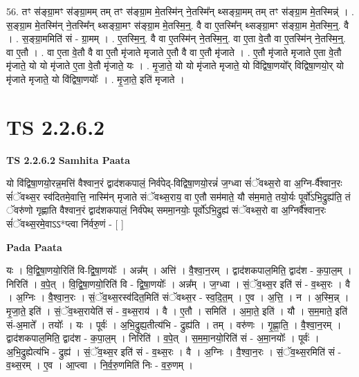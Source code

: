 \documentclass[17pt]{extarticle}
\begin{document}
56. तꣳ स॑ङ्ग्रा॒मꣳ स॑ङ्ग्रा॒मम् तम् तꣳ स॑ङ्ग्रा॒म मे॒तस्मि॑न् ने॒तस्मि᳚न् थ्सङ्ग्रा॒मम् तम् तꣳ स॑ङ्ग्रा॒म मे॒तस्मिन्न्॑ । . स॒ङ्ग्रा॒म मे॒तस्मि॑न् ने॒तस्मि᳚न् थ्सङ्ग्रा॒मꣳ स॑ङ्ग्रा॒म मे॒तस्मि॒न्॒. वै वा ए॒तस्मि᳚न् थ्सङ्ग्रा॒मꣳ स॑ङ्ग्रा॒म मे॒तस्मि॒न्॒. वै । . स॒ङ्ग्रा॒ममिति॑ सं - ग्रा॒मम् । . ए॒तस्मि॒न्॒. वै वा ए॒तस्मि॑न् ने॒तस्मि॒न्॒. वा ए॒ता वे॒तौ वा ए॒तस्मि॑न् ने॒तस्मि॒न्॒. वा ए॒तौ । . वा ए॒ता वे॒तौ वै वा ए॒तौ मृ॑जाते मृजाते ए॒तौ वै वा ए॒तौ मृ॑जाते । . ए॒तौ मृ॑जाते मृजाते ए॒ता वे॒तौ मृ॑जाते॒ यो यो मृ॑जाते ए॒ता वे॒तौ मृ॑जाते॒ यः । . मृ॒जा॒ते॒ यो यो मृ॑जाते मृजाते॒ यो वि॑द्विषा॒णयो᳚र् विद्विषा॒णयो॒र् यो मृ॑जाते मृजाते॒ यो वि॑द्विषा॒णयोः᳚ । . मृ॒जा॒ते॒ इति॑ मृजाते । \newline
\pagebreak
{}
\section*{ TS 2.2.6.2 }

\textbf{TS 2.2.6.2 } \newline
\textbf{Samhita Paata} \newline

यो वि॑द्विषा॒णयो॒रन्न॒मत्ति॑ वैश्वान॒रं द्वाद॑शकपालं॒ निर्व॑पेद्-विद्विषा॒णयो॒रन्नं॑ ज॒ग्ध्वा सं॑ॅवथ्स॒रो वा अ॒ग्नि-र्वै᳚श्वान॒रः सं॑ॅवथ्स॒र स्व॑दितमे॒वात्ति॒ नास्मि॑न् मृजाते संॅवथ्स॒राय॒ वा ए॒तौ सम॑माते॒ यौ स॑म॒माते॒ तयो॒र्यः पूर्वो॑ऽभि॒द्रुह्य॑ति॒ तं ॅवरु॑णो गृह्णाति वैश्वान॒रं द्वाद॑शकपालं॒ निर्व॑पेथ् सममा॒नयोः॒ पूर्वो॑ऽभि॒द्रुह्य॑ संॅवथ्स॒रो वा अ॒ग्निर्वै᳚श्वान॒रः सं॑ॅवथ्स॒रमे॒वाऽऽ*प्त्वा नि॑र्वरु॒णं - [  ] \newline

\textbf{Pada Paata} \newline

यः । वि॒द्वि॒षा॒णयो॒रिति॑ वि-द्वि॒षा॒णयोः᳚ । अन्न᳚म् । अत्ति॑ । वै॒श्वा॒न॒रम् । द्वाद॑शकपाल॒मिति॒ द्वाद॑श - क॒पा॒ल॒म् । निरिति॑ । व॒पे॒त् । वि॒द्वि॒षा॒णयो॒रिति॑ वि - द्वि॒षा॒णयोः᳚ । अन्न᳚म् । ज॒ग्ध्वा । सं॒ॅव॒थ्स॒र इति॑ सं - व॒थ्स॒रः । वै । अ॒ग्निः । वै॒श्वा॒न॒रः । सं॒ॅव॒थ्स॒रस्व॑दित॒मिति॑ संॅवथ्स॒र - स्व॒दि॒त॒म् । ए॒व । अ॒त्ति॒ । न । अ॒स्मि॒न्न् । मृ॒जा॒ते॒ इति॑ । सं॒ॅव॒थ्स॒रायेति॑ सं - व॒थ्स॒राय॑ । वै । ए॒तौ । समिति॑ । अ॒मा॒ते॒ इति॑ । यौ । स॒म॒माते॒ इति॑ सं-अ॒माते᳚ । तयोः᳚ । यः । पूर्वः॑ । अ॒भि॒द्रुह्य॒तीत्य॑भि - द्रुह्य॑ति । तम् । वरु॑णः । गृ॒ह्णा॒ति॒ । वै॒श्वा॒न॒रम् । द्वाद॑शकपाल॒मिति॒ द्वाद॑श - क॒पा॒ल॒म् । निरिति॑ । व॒पे॒त् । स॒म॒मा॒नयो॒रिति॑ सं - अ॒मा॒नयोः᳚ । पूर्वः॑ । अ॒भि॒द्रुह्येत्य॑भि - द्रुह्य॑ । सं॒ॅव॒थ्स॒र इति॑ सं - व॒थ्स॒रः । वै । अ॒ग्निः । वै॒श्वा॒न॒रः । सं॒ॅव॒थ्स॒रमिति॑ सं - व॒थ्स॒रम् । ए॒व । आ॒प्त्वा । नि॒र्व॒रु॒णमिति॑ निः - व॒रु॒णम् ।  \newline
\end{document}
